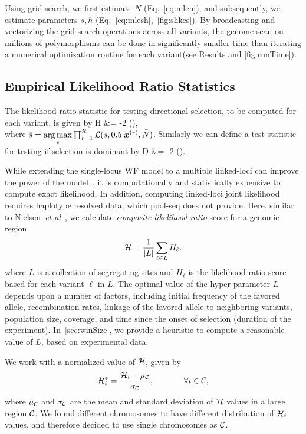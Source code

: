 Using grid search, we first estimate $N$ (Eq.~\ref{eq:mlen}), and
subsequently, we estimate parameters $s,h$ 
(Eq.~\ref{eq:mlesh},~\ref{fig:slikes}). By
broadcasting and vectorizing the grid search operations across all
variants, the genome scan on millions of polymorphisms can be done in
significantly smaller time than iterating a numerical optimization
routine for each variant(see Results and \ref{fig:runTime}).
\subsection{Empirical Likelihood Ratio Statistics}
The  likelihood
ratio statistic for testing directional selection, to be computed for each variant, 
is given by
\beq
	H &= -2 \log 
	\left(\right),\\
	\label{eq:ELRS}
\eeq
where $\bar{s} = \underset{s}{\arg \max} \prod_{r=1}^R 
 {\cal L}(s,0.5|\bm{x}^{(r)},\widehat{N})$. Similarly we can define a test statistic for testing 
 if selection is dominant by
\beq
 D &= -2 \log 
 \left(\right).
 \eeq



 While extending the single-locus WF model to a multiple linked-loci
 can improve the power of the model~\cite{Terhorst2015Multi}, it is
 computationally and statistically expensive to compute exact
 likelihood. In addition, computing linked-loci joint likelihood requires  
 haplotype resolved data, which pool-seq
 does not provide. Here, similar to Nielsen~\emph{et
   al}~\cite{nielsen2005genomic}, we calculate \emph{composite likelihood
 ratio} score for a genomic region.
\begin{equation}
{\cal H} = \frac{1}{|L|}\sum_{\ell \in L} H_\ell.
\label{eq:pihmm}
\end{equation}
where $L$ is a collection of segregating sites and $H_\ell$ is the
likelihood ratio score based for each variant $\ell$ in $L$.  The
optimal value of the hyper-parameter $L$ depends upon a number of
factors, including initial frequency of the favored allele,
recombination rates, linkage of the favored allele to neighboring
variants, population size, coverage, and time since the onset of
selection (duration of the experiment). In~\ref{sec:winSize}, we
provide a heuristic to compute a reasonable value of $L$, based on
experimental data. 

We work with a normalized value of ${\cal H}$, given by
\begin{equation} {\cal H}_i^*=\frac{{\cal H}_i-\mu_{\cal C}}{\sigma_{\cal C}},
\hspace{0.5in} \forall i \in {\cal C},
\end{equation} 
where $\mu_{\cal C}$ and $\sigma_{\cal C}$ are the mean and standard deviation
of ${\cal H}$ values in a large region ${\cal C}$. We found different
chromosomes to have different distribution of ${\cal H}_i$ values, and
therefore decided to use single chromosomes as ${\cal C}$.
